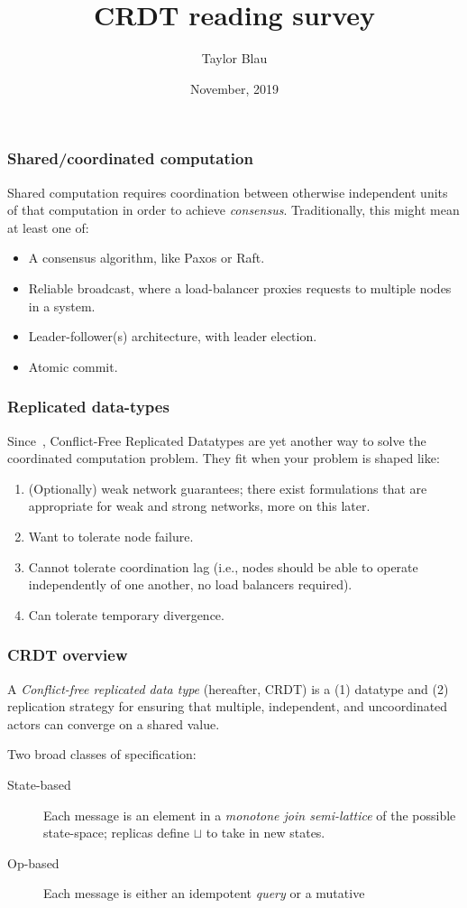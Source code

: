 \documentclass[aspectratio=169,compress]{beamer}
\title{CRDT reading survey}
\author{Taylor Blau}
\institute{University of Washington}
\date{November, 2019}
\begin{document}
  \frame{\titlepage}

  \begin{frame}
    \frametitle{Shared/coordinated computation}

    Shared computation requires coordination between otherwise independent units
    of that computation in order to achieve \textit{consensus}. Traditionally,
    this might mean at least one of:

    \begin{itemize}
      \item A consensus algorithm, like Paxos or Raft.
      \item Reliable broadcast, where a load-balancer proxies requests to
        multiple nodes in a system.
      \item Leader-follower(s) architecture, with leader election.
      \item Atomic commit.
    \end{itemize}
  \end{frame}

  \begin{frame}
    \frametitle{Replicated data-types}

    Since~\cite{shapiro11}, Conflict-Free Replicated Datatypes are yet another
    way to solve the coordinated computation problem. They fit when your problem
    is shaped like:
    \begin{enumerate}
      \item (Optionally) weak network guarantees; there exist formulations that
        are appropriate for weak and strong networks, more on this later.
      \item Want to tolerate node failure.
      \item Cannot tolerate coordination lag (i.e., nodes should be able to
        operate independently of one another, no load balancers required).
      \item Can tolerate temporary divergence.
    \end{enumerate}
  \end{frame}

  \begin{frame}
    \frametitle{CRDT overview}

    A \textit{Conflict-free replicated data type} (hereafter, CRDT) is a (1)
    datatype and (2) replication strategy for ensuring that multiple,
    independent, and uncoordinated actors can converge on a shared value.

    \vspace{1em}

    Two broad classes of specification:
    \begin{description}
      \item[State-based] Each message is an element in a \textit{monotone join
        semi-lattice} of the possible state-space; replicas define $\sqcup$ to
        take in new states.
      \item[Op-based] Each message is either an idempotent \textit{query} or a
        mutative
    \end{description}
  \end{frame}
\end{document}
